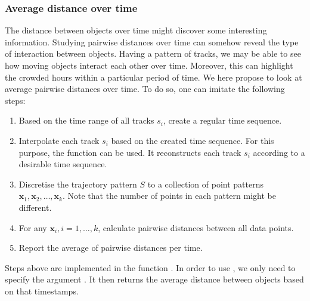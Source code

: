 \documentclass[article]{jss}
\begin{document}
\subsubsection{Average distance over time}
  The distance between objects over time might discover some interesting information. Studying pairwise distances over time can somehow reveal the type of interaction between objects. Having a pattern of tracks, we may be able to see how moving objects interact each other over time. Moreover, this can highlight the crowded hours within a particular period of time. We here propose to look at average pairwise distances over time. To do so, one can imitate the following steps:
  \begin{leftbar}
  \begin{enumerate}
  \item Based on the time range of all tracks $s_i$, create a regular time sequence.
  \item Interpolate each track $s_i$ based on the created time sequence. For this purpose, the function  can be used. It reconstructs each track $s_i$ according to a desirable time sequence.
  \item Discretise the trajectory pattern $S$ to a collection of point patterns $\textbf{x}_1,\textbf{x}_2, \ldots, \textbf{x}_k$. Note that the number of points in each pattern might be different.
  \item For any $\mathbf{x}_i ,i=1,\ldots,k$, calculate pairwise distances between all data points.
  \item Report the average of pairwise distances per time.
  \end{enumerate}
  \end{leftbar}
  Steps above are implemented in the function . In order to use , we only need to specify the argument . It then returns the average distance between objects based on that timestamps. 
\begin{Schunk}
\end{Schunk}
\end{document}
